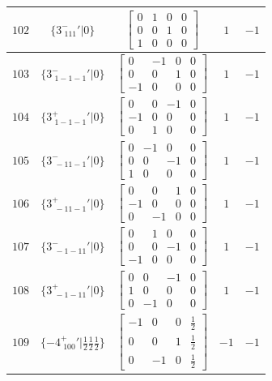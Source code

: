 \documentclass[fleqn,8pt]{jsarticle}
\begin{document}
\begin{longtable}{ccccc}
$ 102 $ & $ \{3^{-}_{\,\,111}{}'|0\} $ & $ \begin{bmatrix} 0 & 1 & 0 & 0 \\ 0 & 0 & 1 & 0 \\ 1 & 0 & 0 & 0 \end{bmatrix} $ & $ 1 $ & $ -1 $ \\ \hline
$ 103 $ & $ \{3^{-}_{\,\,1-1-1}{}'|0\} $ & $ \begin{bmatrix} 0 & -1 & 0 & 0 \\ 0 & 0 & 1 & 0 \\ -1 & 0 & 0 & 0 \end{bmatrix} $ & $ 1 $ & $ -1 $ \\ \hline
$ 104 $ & $ \{3^{+}_{\,\,1-1-1}{}'|0\} $ & $ \begin{bmatrix} 0 & 0 & -1 & 0 \\ -1 & 0 & 0 & 0 \\ 0 & 1 & 0 & 0 \end{bmatrix} $ & $ 1 $ & $ -1 $ \\ \hline
$ 105 $ & $ \{3^{-}_{\,\,-11-1}{}'|0\} $ & $ \begin{bmatrix} 0 & -1 & 0 & 0 \\ 0 & 0 & -1 & 0 \\ 1 & 0 & 0 & 0 \end{bmatrix} $ & $ 1 $ & $ -1 $ \\ \hline
$ 106 $ & $ \{3^{+}_{\,\,-11-1}{}'|0\} $ & $ \begin{bmatrix} 0 & 0 & 1 & 0 \\ -1 & 0 & 0 & 0 \\ 0 & -1 & 0 & 0 \end{bmatrix} $ & $ 1 $ & $ -1 $ \\ \hline
$ 107 $ & $ \{3^{-}_{\,\,-1-11}{}'|0\} $ & $ \begin{bmatrix} 0 & 1 & 0 & 0 \\ 0 & 0 & -1 & 0 \\ -1 & 0 & 0 & 0 \end{bmatrix} $ & $ 1 $ & $ -1 $ \\ \hline
$ 108 $ & $ \{3^{+}_{\,\,-1-11}{}'|0\} $ & $ \begin{bmatrix} 0 & 0 & -1 & 0 \\ 1 & 0 & 0 & 0 \\ 0 & -1 & 0 & 0 \end{bmatrix} $ & $ 1 $ & $ -1 $ \\ \hline
$ 109 $ & $ \{-4^{+}_{\,\,100}{}'|\frac{1}{2} \frac{1}{2} \frac{1}{2}\} $ & $ \begin{bmatrix} -1 & 0 & 0 & \frac{1}{2} \\ 0 & 0 & 1 & \frac{1}{2} \\ 0 & -1 & 0 & \frac{1}{2} \end{bmatrix} $ & $ -1 $ & $ -1 $ \\ \hline

\end{longtable}
\end{document}
